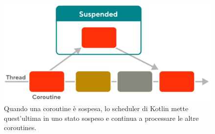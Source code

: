 \documentclass[12pt,a4paper,openright,twoside]{book}
\begin{document}
\begin{figure}
    \centering
    \includegraphics[width=.90\linewidth]{figures/reactive-programming/suspending-function.png}
    \caption{Quando una coroutine è sospesa, lo scheduler di Kotlin mette quest'ultima in uno stato sospeso e continua a processare le altre coroutines.}
    \label{fig:suspending-function}
\end{figure}
\end{document}
